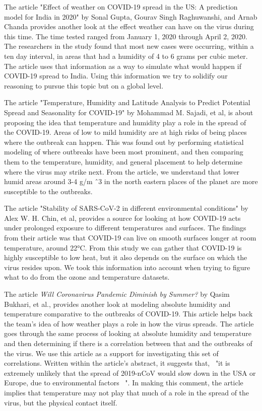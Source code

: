 \documentclass[10pt,journal,compsoc]{IEEEtran}
\begin{document}
	The article "Effect of weather on COVID-19 spread in the US: A prediction model for India in 2020" by Sonal Gupta, Gourav Singh Raghuwanshi, and Arnab Chanda provides another look at the effect weather can have on the virus during this time.\cite{Gupta-2020} The time tested ranged from January 1, 2020 through April 2, 2020. The researchers in the study found that most new cases were occurring, within a ten day interval, in areas that had a humidity of 4 to 6 grams per cubic meter. \cite{Gupta-2020} The article uses that information as a way to simulate what would happen if COVID-19 spread to India. \cite{Gupta-2020} Using this information we try to solidify our reasoning to pursue this topic but on a global level.

	The article "Temperature, Humidity and Latitude Analysis to Predict Potential Spread and Seasonality for COVID-19" by Mohammad M. Sajadi, et al, is about proposing the idea that temperature and humidity play a role in the spread of the COVID-19. \cite{Sajadi-2020} Areas of low to mild humidity are at high risks of being places where the outbreak can happen. \cite{Sajadi-2020} This was found out by performing statistical modeling of where outbreaks have been most prominent, and then comparing them to the temperature, humidity, and general placement to help determine where the virus may strike next. \cite{Sajadi-2020} From the article, we understand that lower humid areas around 3-4 g/m \^ \ 3 in the north eastern places of the planet are more susceptible to the outbreaks. \cite{Sajadi-2020}

	The article "Stability of SARS-CoV-2 in different environmental conditions" by Alex W. H. Chin, et al, provides a source for looking at how COVID-19 acts under prolonged exposure to different temperatures and surfaces. \cite{Chin-2020} The findings from their article was that COVID-19 can live on smooth surfaces longer at room temperature, around 22°C. \cite{Chin-2020} From this study we can gather that COVID-19 is highly susceptible to low heat, but it also depends on the surface on which the virus resides upon. We took this information into account when trying to figure what to do from the ozone and temperature datasets. 

	The article \textit{Will Coronavirus Pandemic Diminish by Summer?} by Qasim Bukhari, et al., provides another look at modeling absolute humidity and temperature comparative to the outbreaks of COVID-19. \cite{Bukhari-2020} This article helps back the team's idea of how weather plays a role in how the virus spreads. The article goes through the same process of looking at absolute humidity and temperature and then determining if there is a correlation between that and the outbreaks of the virus. We use this article as a support for investigating this set of correlations. Written within the article's abstract, it suggests that, \ "it is extremely unlikely that the spread of 2019-nCoV would slow down in the USA or Europe, due to environmental factors \ ". \cite{Bukhari-2020} In making this comment, the article implies that temperature may not play that much of a role in the spread of the virus, but the physical contact itself.
\end{document}
